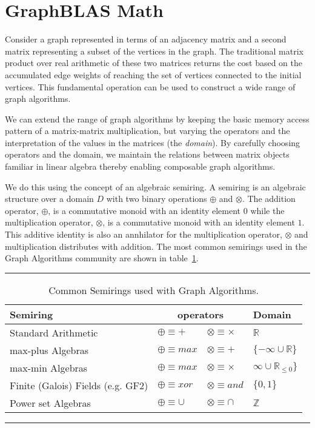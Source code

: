 \section{GraphBLAS Math}
\label{sec:math}

Consider a graph represented in terms of an adjacency matrix and a second
matrix representing a subset of the vertices in the graph.  The traditional
matrix product over real arithmetic of these two matrices returns the
cost based on the accumulated edge weights of reaching the 
set of vertices connected to the initial vertices.   This fundamental
operation can be used to construct a wide range of graph algorithms.

We can extend the range of graph algorithms by keeping the basic
memory access pattern of a matrix-matrix multiplication, but varying
the operators and the interpretation of the values in the matrices (the \emph{domain}).
By carefully choosing operators and the domain, we maintain the
relations between matrix objects familiar in linear algebra thereby enabling
composable graph algorithms.

We do this using the concept of an algebraic semiring.   A semiring is an algebraic
structure over a domain $D$ with two binary operations $\oplus$ and $\otimes$.
The addition operator, $\oplus$, is a commutative monoid with an identity element $0$
while the multiplication operator, $\otimes$, is a commutative monoid with an 
identity element $1$.  This additive identity is also an annhilator for the multiplication 
operator, $\otimes$ and multiplication distributes with addition.  The most 
common semirings used in the Graph Algorithms community are 
shown in table~\ref{Tab:semirings}.

  
\begin{table}[h]
\hrule
\begin{center}
\caption{Common Semirings used with Graph Algorithms.}
\label{Tab:semirings}
\begin{tabular}{llll}
{\sf Semiring} & \multicolumn{2}{c}{operators} & Domain \\
\hline
Standard Arithmetic         & $\oplus   \equiv + $ & $\otimes \equiv   \times $  & $ \mathbb{R} $\\
max-plus Algebras           & $\oplus   \equiv max $ & $\otimes \equiv  + $  & $  \{-\infty \cup  \mathbb{R} \}$\\
max-min Algebras           & $\oplus   \equiv max $ & $\otimes \equiv  \times $  & $  \infty \cup  \mathbb{R}_{\leq 0}\} $\\
Finite (Galois) Fields (e.g. GF2)      & $\oplus   \equiv xor $ & $\otimes \equiv  and $  & $  \{0, 1\}$\\
Power set Algebras         & $\oplus   \equiv \cup $ & $\otimes \equiv  \cap $  & $  \mathbb{Z} $\\
\end{tabular}
\end{center}
\hrule
\end{table}

